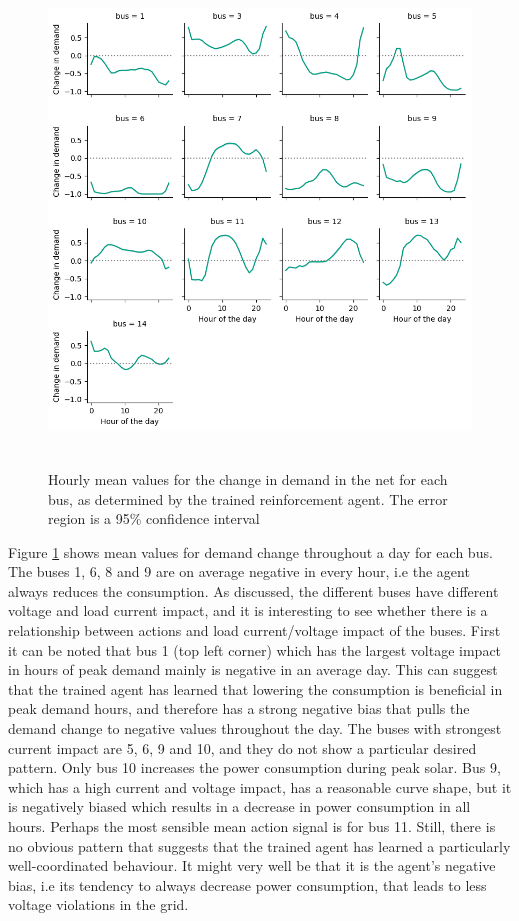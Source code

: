 \documentclass[class=book, crop=false, 11pt]{standalone}
\begin{document}
\begin{figure}[h]
    \center
\includegraphics[height=13cm, width=12cm]{figures/config1_action_bus.png}
    \caption[size = 9]{Hourly mean values for the change in demand in the net for each bus, as determined by the trained reinforcement agent. The error region is a 95\% confidence interval}
    \label{fig:discussion:config1_action_bus}
\end{figure}

Figure \ref{fig:discussion:config1_action_bus} shows mean values for demand change throughout a day for each bus.  The buses 1, 6, 8 and 9 are on average negative in every hour, i.e the agent always reduces the consumption. As discussed, the different buses have different voltage and load current impact, and it is interesting to see whether there is a relationship between actions and load current/voltage impact of the buses. First it can be noted that bus 1 (top left corner) which has the largest voltage impact in hours of peak demand mainly is negative in an average day. This can suggest that the trained agent has learned that lowering the consumption is beneficial in peak demand hours, and therefore has a strong negative bias that pulls the demand change to negative values throughout the day. The buses with strongest current impact are 5, 6, 9 and 10, and they do not show a particular desired pattern. Only bus 10 increases the power consumption during peak solar. Bus 9, which has a high current and voltage impact, has a reasonable curve shape, but it is negatively biased which results in a decrease in power consumption in all hours. Perhaps the most sensible mean action signal is for bus 11. Still, there is no obvious pattern that suggests that the trained agent has learned a particularly well-coordinated behaviour. It might very well be that it is the agent's negative bias, i.e its tendency to always decrease power consumption, that leads to less voltage violations in the grid.
\end{document}
